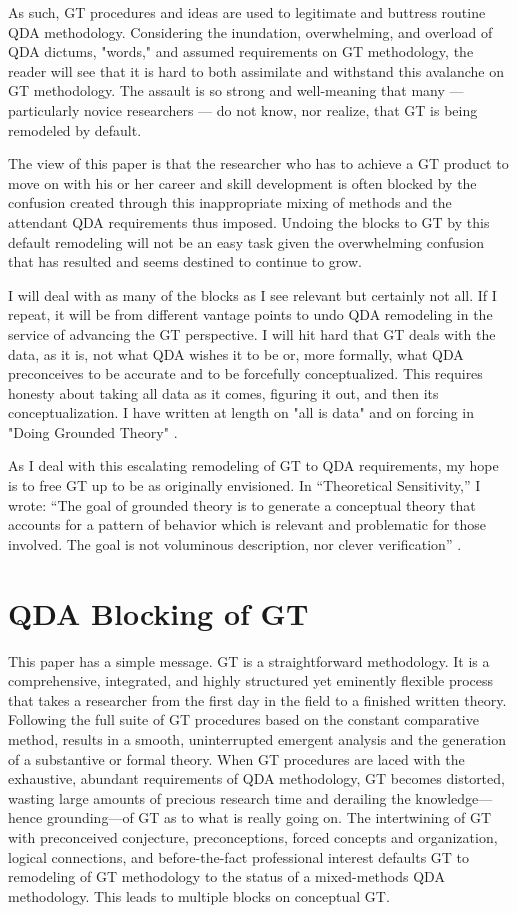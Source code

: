 As such, GT procedures and ideas are used to legitimate and buttress routine QDA methodology. 
Considering the inundation, overwhelming, and overload of QDA dictums, "words," and assumed requirements on GT methodology, the reader will see that it is hard to both assimilate and withstand this avalanche on GT methodology. 
The assault is so strong and well-meaning that many --- particularly novice researchers --- do not know, nor realize, that GT is being remodeled by default.

The view of this paper is that the researcher who has to achieve a GT product to move on with his or her career and skill development is often blocked by the confusion created through this inappropriate mixing of methods and the attendant QDA requirements thus imposed. 
Undoing the blocks to GT by this default remodeling will not be an easy task given the overwhelming confusion that has resulted and seems destined to continue to grow.

I will deal with as many of the blocks as I see relevant but certainly not all. 
If I repeat, it will be from different vantage points to undo QDA remodeling in the service of advancing the GT perspective. 
I will hit hard that GT deals with the data, as it is, not what QDA wishes it to be or, more formally, what QDA preconceives to be accurate and to be forcefully conceptualized. 
This requires honesty about taking all data as it comes, figuring it out, and then its conceptualization. 
I have written at length on "all is data" and on forcing in "Doing Grounded Theory" 
\citep{book.glaser98a}.

As I deal with this escalating remodeling of GT to QDA requirements, my hope is to free GT up to be as originally envisioned. 
In “Theoretical Sensitivity,” I wrote: “The goal of grounded theory is to generate a conceptual theory that accounts for a pattern of behavior which is relevant and problematic for those involved. 
The goal is not voluminous description, nor clever verification”
\citep{book.glaser78}.

\section*{QDA Blocking of GT}

This paper has a simple message. GT is a straightforward methodology. It is a comprehensive, integrated, and highly structured yet eminently flexible process that takes a researcher from the first day in the field to a finished written theory.
Following the full suite of GT procedures based on the constant comparative method, results in a smooth, uninterrupted emergent analysis and the generation of a substantive or formal theory.
When GT procedures are laced with the exhaustive, abundant requirements of QDA methodology, GT becomes distorted, wasting large amounts of precious research time and derailing the knowledge—hence grounding—of GT as to what is really going on. 
The intertwining of GT with preconceived conjecture, preconceptions, forced concepts and organization, logical connections, and before-the-fact professional interest defaults GT to remodeling of GT methodology to the status of a mixed-methods QDA methodology. 
This leads to multiple blocks on conceptual GT.

